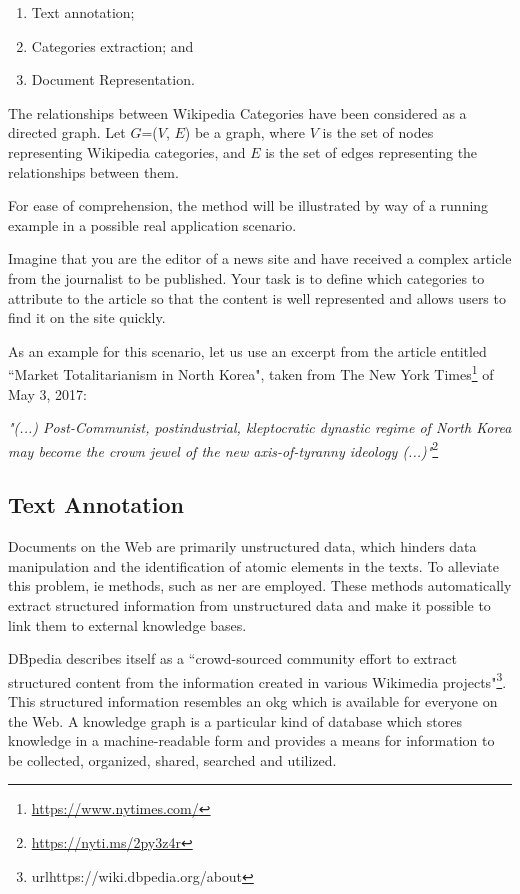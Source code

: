 \begin{enumerate}
\item Text annotation;
\item Categories extraction; and
\item Document Representation.

\end{enumerate}
The relationships between Wikipedia Categories have been considered as a directed graph. Let $G$=($V$, $E$) be a graph, where $V$ is the set of nodes representing Wikipedia categories, and $E$ is the set of edges representing the relationships between them.

For ease of comprehension, the method will be illustrated by way of a running example in a possible real application scenario.
 
 
Imagine that you are the editor of a news site and have received a complex article from the journalist to be published. Your task is to define which categories to attribute to the article so that the content is well represented and allows users to find it on the site quickly. 


As an example for this scenario, let us use an excerpt from the article entitled ``Market Totalitarianism in North Korea", taken from The New York Times\footnote{\url{https://www.nytimes.com/}} of May 3, 2017: \

\textit{"(...) Post-Communist, postindustrial, kleptocratic dynastic regime of North Korea may become the crown jewel of the new axis-of-tyranny ideology (...)"}\footnote{\url{https://nyti.ms/2py3z4r}} \



\subsection{\hspace*{3pt} Text Annotation} 
\label{sec:text-annotation}

Documents on the Web are primarily unstructured data, which hinders data manipulation and the identification of atomic elements in the texts. To alleviate this problem, \gls{ie} methods, such as \gls{ner} are employed. These methods automatically extract structured information from unstructured data and make it possible to link them to external knowledge bases. 

DBpedia describes itself as a ``crowd-sourced community effort to extract structured content from the information created in various Wikimedia projects"\footnote{url{https://wiki.dbpedia.org/about}}. This structured information resembles an \gls{okg} which is available for everyone on the Web.
A knowledge graph is a particular kind of database which stores knowledge in a machine-readable form and provides a means for information to be collected, organized, shared, searched and utilized.

